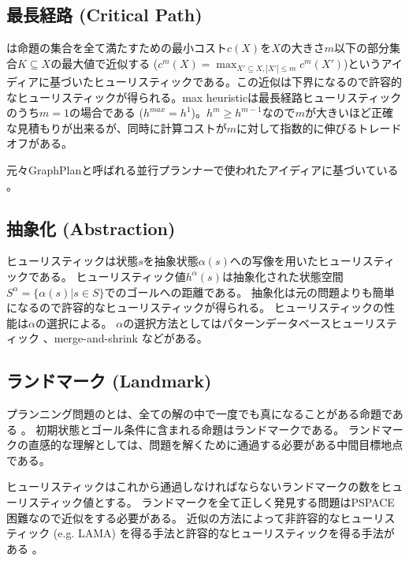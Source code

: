 \subsection{最長経路 (Critical Path)}

 \cite{haslum:00}は命題の集合を全て満たすための最小コスト$c(X)$を$X$の大きさ$m$以下の部分集合$K \subseteq X$の最大値で近似する ($c^m(X) = \max_{X' \subseteq X, |X'| \leq m} c^m(X')$)というアイディアに基づいたヒューリスティックである。この近似は下界になるので許容的なヒューリスティックが得られる。max heuristicは最長経路ヒューリスティックのうち$m=1$の場合である ($h^{max} = h^1$)。$h^m \geq h^{m-1}$なので$m$が大きいほど正確な見積もりが出来るが、同時に計算コストが$m$に対して指数的に伸びるトレードオフがある。

元々GraphPlanと呼ばれる並行プランナーで使われたアイディアに基づいている \cite{blum:97}。

\subsection{抽象化 (Abstraction)}

ヒューリスティックは状態$s$を抽象状態$\alpha(s)$への写像を用いたヒューリスティックである。
ヒューリスティック値$h^\alpha(s)$は抽象化された状態空間$S^\alpha = \{\alpha(s) | s \in S\}$でのゴールへの距離である。
抽象化は元の問題よりも簡単になるので許容的なヒューリスティックが得られる。
ヒューリスティックの性能は$\alpha$の選択による。
$\alpha$の選択方法としてはパターンデータベースヒューリスティック \cite{culberson1998pattern,edelkamp2001planning,holte:04,katz2008structural}、merge-and-shrink \cite{helmert2007flexible,helmert2014merge}などがある。

\subsection{ランドマーク (Landmark)}

プランニング問題のとは、全ての解の中で一度でも真になることがある命題である \cite{porteous2001extraction}。
初期状態とゴール条件に含まれる命題はランドマークである。
ランドマークの直感的な理解としては、問題を解くために通過する必要がある中間目標地点である。

ヒューリスティックはこれから通過しなければならないランドマークの数をヒューリスティック値とする。
ランドマークを全て正しく発見する問題はPSPACE困難なので近似をする必要がある。
近似の方法によって非許容的なヒューリスティック (e.g. LAMA) \cite{richter2008landmarks}を得る手法と許容的なヒューリスティックを得る手法がある \cite{karpas2009cost}。

